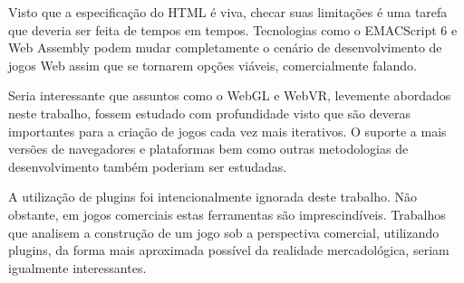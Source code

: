 Visto que a especificação do HTML é viva, checar suas limitações
é uma tarefa que deveria ser feita de tempos em tempos. Tecnologias
como o EMACScript 6 e Web Assembly podem mudar completamente o cenário
de desenvolvimento de jogos Web assim que se tornarem opções viáveis,
comercialmente falando.

Seria interessante que assuntos como o WebGL e WebVR, levemente
abordados neste trabalho, fossem estudado com profundidade visto que
são deveras importantes para a criação de jogos cada vez mais
iterativos. O suporte a mais versões de navegadores e plataformas
bem como outras metodologias de desenvolvimento também poderiam ser
estudadas.

A utilização de plugins foi intencionalmente ignorada deste
trabalho. Não obstante, em jogos comerciais estas ferramentas são
imprescindíveis. Trabalhos que analisem a construção de um jogo sob
a perspectiva comercial, utilizando plugins, da forma mais aproximada
possível da realidade mercadológica, seriam igualmente interessantes.

